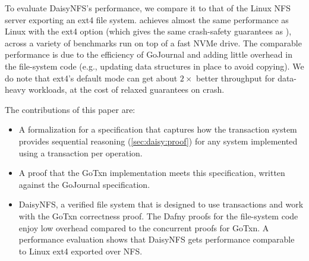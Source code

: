 
To evaluate DaisyNFS's performance, we compare it to that of the Linux NFS server
exporting an ext4 file system. \sys achieves almost the same performance as
Linux with the ext4  option (which gives the same crash-safety
guarantees as \sys), across a variety of benchmarks run on top of a fast NVMe
drive. The comparable performance is due to the efficiency of GoJournal and
adding little overhead in the file-system code (e.g., updating data structures
in place to avoid copying). We do note that ext4's default 
mode can get about $2\times$ better throughput for data-heavy workloads, at the
cost of relaxed guarantees on crash.

The contributions of this paper are: 
\begin{itemize}
  \item A formalization for a specification that captures how the transaction
  system provides sequential reasoning (\cref{sec:daisy:proof}) for any system
  implemented using a transaction per operation.
  \item A proof that the GoTxn implementation meets this specification, written
  against the GoJournal specification.
  \item DaisyNFS, a verified file system that is designed to use transactions
  and work with the GoTxn correctness proof. The Dafny proofs for the
  file-system code enjoy low overhead compared to the concurrent proofs for GoTxn. A performance
  evaluation shows that DaisyNFS gets performance comparable to Linux ext4
  exported over NFS.
\end{itemize}

